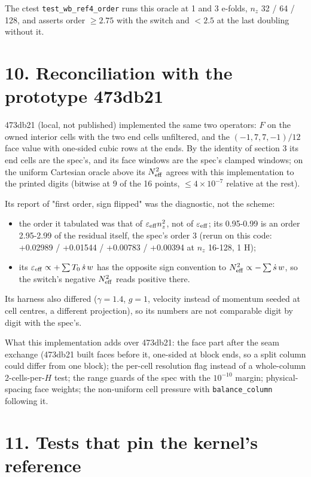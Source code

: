 \documentclass[11pt,a4paper]{article}
\begin{document}
The ctest \texttt{test\_wb\_ref4\_order} runs this oracle at 1 and 3 e-folds, $n_z$ 32 / 64 / 128, and asserts order
$\ge 2.75$ with the switch and $< 2.5$ at the last doubling without it.

\section*{10. Reconciliation with the prototype 473db21}

473db21 (local, not published) implemented the same two operators: $F$ on the owned interior cells with the
two end cells unfiltered, and the $(-1, 7, 7, -1)/12$ face value with one-sided cubic rows at the ends.
By the identity of section 3 its end cells are the spec's, and its face windows are the spec's clamped windows;
on the uniform Cartesian oracle above its $N^2_{\rm eff}$ agrees with this implementation to the printed
digits (bitwise at 9 of the 16 points, $\le 4\times10^{-7}$ relative at the rest).

Its report of "first order, sign flipped" was the diagnostic, not the scheme:

\begin{itemize}
\item the order it tabulated was that of $\varepsilon_{\rm eff}n_z^2$, not of $\varepsilon_{\rm eff}$; its 0.95-0.99 is an
  order 2.95-2.99 of the residual itself, the spec's order 3 (rerun on this code: +0.02989 / +0.01544 /
  +0.00783 / +0.00394 at $n_z$ 16-128, 1 H);
\item its $\varepsilon_{\rm eff} \propto +\sum T_0\,\dot s\, w$ has the opposite sign convention to
  $N^2_{\rm eff} \propto -\sum\dot s\, w$, so the switch's negative $N^2_{\rm eff}$ reads positive there.
\end{itemize}

Its harness also differed ($\gamma = 1.4$, $g = 1$, velocity instead of momentum seeded at cell centres, a
different projection), so its numbers are not comparable digit by digit with the spec's.

What this implementation adds over 473db21: the face part after the seam exchange (473db21 built faces before
it, one-sided at block ends, so a split column could differ from one block); the per-cell resolution flag
instead of a whole-column 2-cells-per-$H$ test; the range guards of the spec with the $10^{-10}$ margin;
physical-spacing face weights; the non-uniform cell pressure with \texttt{balance\_column} following it.

\section*{11. Tests that pin the kernel's reference}
\end{document}
